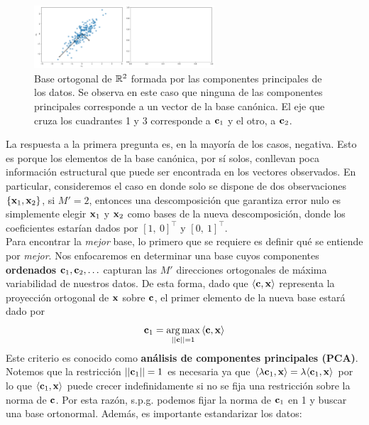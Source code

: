 \begin{figure}[H]
	\centering
	\includegraphics[width=0.6\textwidth]{img/cap8_pca.pdf}
	\caption{Base ortogonal de $\mathbb{R}^2$ formada por las componentes principales de los datos. Se observa en este caso que ninguna de las componentes principales corresponde a un vector de la base canónica. El eje que cruza los cuadrantes 1 y 3 corresponde a $\mathbf{c}_1$ y el otro, a $\mathbf{c}_2$.}
	\label{fig:ej_fda}
\end{figure}

La respuesta a la primera pregunta es, en la mayoría de los casos, negativa. Esto es porque los elementos de la base canónica, por sí solos, conllevan poca información estructural que puede ser encontrada en los vectores observados. En particular, consideremos el caso en donde solo se dispone de dos observaciones $\{\mathbf{x}_1, \mathbf{x}_2\}$, si $M'=2$, entonces una descomposición que garantiza error nulo es simplemente elegir $\mathbf{x}_1$ y $\mathbf{x}_2$ como bases de la nueva descomposición, donde los coeficientes estarían dados por $[1,\ 0]^\top$ y $[0,\ 1]^\top$.\\

Para encontrar la \emph{mejor} base, lo primero que se requiere es definir qué se entiende por \emph{mejor}. Nos enfocaremos en determinar una base cuyos componentes \textbf{ordenados} $\mathbf{c}_1,\mathbf{c}_2,\ldots$ capturan las $M'$ direcciones ortogonales de máxima variabilidad de nuestros datos. De esta forma, dado que $\langle\mathbf{c},\mathbf{x}\rangle$ representa la proyección ortogonal de $\mathbf{x}$ sobre $\mathbf{c}$, el primer elemento de la nueva base estará dado por 
\begin{equation}
	\mathbf{c}_1 = \operatorname*{arg\,max}_{||\mathbf{c}||=1} {\langle\mathbf{c},\mathbf{x}\rangle} \label{eq:PCA_max}
\end{equation}
Este criterio es conocido como \textbf{análisis de componentes principales (PCA)}. Notemos que la restricción $||\mathbf{c}_1||=1$ es necesaria ya que $\langle\lambda\mathbf{c}_1,\mathbf{x}\rangle = \lambda\langle\mathbf{c}_1,\mathbf{x}\rangle$ por lo que $\langle\mathbf{c}_1,\mathbf{x}\rangle$ puede crecer indefinidamente si no se fija una restricción sobre la norma de $\mathbf{c}$. Por esta razón, s.p.g. podemos fijar la norma de $\mathbf{c}_1$ en 1 y buscar una base ortonormal. Además, es importante estandarizar los datos:

